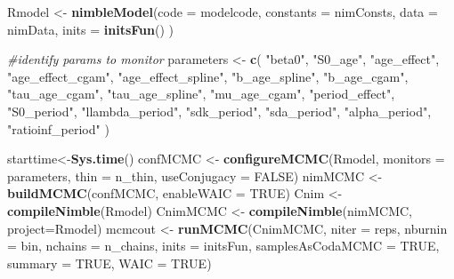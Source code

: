 \documentclass[11pt,]{article}
\newenvironment{Shaded}{\begin{snugshade}}{\end{snugshade}}
\newcommand{\KeywordTok}[1]{\textcolor[rgb]{0.13,0.29,0.53}{\textbf{#1}}}
\newcommand{\DataTypeTok}[1]{\textcolor[rgb]{0.13,0.29,0.53}{#1}}
\newcommand{\StringTok}[1]{\textcolor[rgb]{0.31,0.60,0.02}{#1}}
\newcommand{\CommentTok}[1]{\textcolor[rgb]{0.56,0.35,0.01}{\textit{#1}}}
\newcommand{\OtherTok}[1]{\textcolor[rgb]{0.56,0.35,0.01}{#1}}
\newcommand{\NormalTok}[1]{#1}
\begin{document}
\begin{Shaded}
\begin{Highlighting}[]
\NormalTok{Rmodel <-}\StringTok{ }\KeywordTok{nimbleModel}\NormalTok{(}\DataTypeTok{code =}\NormalTok{ modelcode,}
                      \DataTypeTok{constants =}\NormalTok{ nimConsts,}
                      \DataTypeTok{data =}\NormalTok{ nimData,}
                      \DataTypeTok{inits =} \KeywordTok{initsFun}\NormalTok{()}
\NormalTok{                      )}

\CommentTok{#identify params to monitor}
\NormalTok{parameters <-}\StringTok{ }\KeywordTok{c}\NormalTok{(}
              \StringTok{"beta0"}\NormalTok{,}
              \StringTok{"S0_age"}\NormalTok{,}
              \StringTok{"age_effect"}\NormalTok{,}
              \StringTok{"age_effect_cgam"}\NormalTok{,}
              \StringTok{"age_effect_spline"}\NormalTok{,}
              \StringTok{"b_age_spline"}\NormalTok{,}
              \StringTok{"b_age_cgam"}\NormalTok{,}
              \StringTok{"tau_age_cgam"}\NormalTok{,}
              \StringTok{"tau_age_spline"}\NormalTok{,}
              \StringTok{"mu_age_cgam"}\NormalTok{,}
              \StringTok{"period_effect"}\NormalTok{,}
              \StringTok{"S0_period"}\NormalTok{,}
              \StringTok{"llambda_period"}\NormalTok{,}
              \StringTok{"sdk_period"}\NormalTok{,}
              \StringTok{"sda_period"}\NormalTok{,}
              \StringTok{"alpha_period"}\NormalTok{,}
              \StringTok{"ratioinf_period"}
\NormalTok{              )}

\NormalTok{starttime<-}\KeywordTok{Sys.time}\NormalTok{()}
\NormalTok{confMCMC <-}\StringTok{ }\KeywordTok{configureMCMC}\NormalTok{(Rmodel,}
                          \DataTypeTok{monitors =}\NormalTok{ parameters,}
                          \DataTypeTok{thin =}\NormalTok{ n_thin,}
                          \DataTypeTok{useConjugacy =} \OtherTok{FALSE}\NormalTok{)}
\NormalTok{nimMCMC <-}\StringTok{ }\KeywordTok{buildMCMC}\NormalTok{(confMCMC, }\DataTypeTok{enableWAIC =} \OtherTok{TRUE}\NormalTok{)}
\NormalTok{Cnim <-}\StringTok{ }\KeywordTok{compileNimble}\NormalTok{(Rmodel)}
\NormalTok{CnimMCMC <-}\StringTok{ }\KeywordTok{compileNimble}\NormalTok{(nimMCMC, }\DataTypeTok{project=}\NormalTok{Rmodel)}
\NormalTok{mcmcout <-}\StringTok{ }\KeywordTok{runMCMC}\NormalTok{(CnimMCMC,}
                   \DataTypeTok{niter =}\NormalTok{ reps,}
                   \DataTypeTok{nburnin =}\NormalTok{ bin,}
                   \DataTypeTok{nchains =}\NormalTok{ n_chains,}
                   \DataTypeTok{inits =}\NormalTok{ initsFun,}
                   \DataTypeTok{samplesAsCodaMCMC =} \OtherTok{TRUE}\NormalTok{,}
                   \DataTypeTok{summary =} \OtherTok{TRUE}\NormalTok{,}
                   \DataTypeTok{WAIC =} \OtherTok{TRUE}\NormalTok{)}


\end{Highlighting}
\end{Shaded}
\end{document}
